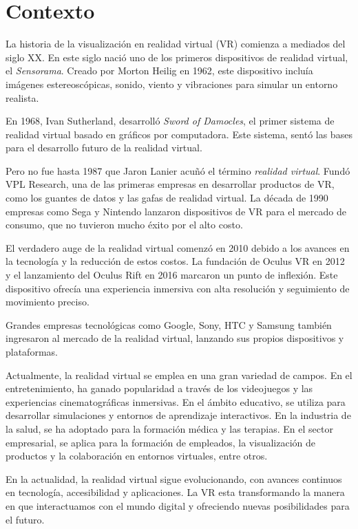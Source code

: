 \documentclass[a4paper, 12pt]{book}
\begin{document}
\section{Contexto}
\label{sec:seccion}


La historia de la visualización en realidad virtual (VR) comienza a mediados del siglo XX. En este siglo nació uno de los primeros dispositivos de realidad virtual, el \textit{Sensorama}. Creado por Morton Heilig en 1962, este dispositivo incluía imágenes estereoscópicas, sonido, viento y vibraciones para simular un entorno realista.

En 1968, Ivan Sutherland, desarrolló \textit{Sword of Damocles}, el primer sistema de realidad virtual basado en gráficos por computadora. Este sistema, sentó las bases para el desarrollo futuro de la realidad virtual.

Pero no fue hasta 1987 que Jaron Lanier acuñó el término \textit{realidad virtual}. Fundó VPL Research, una de las primeras empresas en desarrollar productos de VR, como los guantes de datos y las gafas de realidad virtual. La década de 1990 empresas como Sega y Nintendo lanzaron dispositivos de VR para el mercado de consumo, que no tuvieron mucho éxito por el alto costo.

El verdadero auge de la realidad virtual comenzó en 2010 debido a los avances en la tecnología y la reducción de estos costos. La fundación de Oculus VR en 2012 y el lanzamiento del Oculus Rift en 2016 marcaron un punto de inflexión. Este dispositivo ofrecía una experiencia inmersiva con alta resolución y seguimiento de movimiento preciso.

Grandes empresas tecnológicas como Google, Sony, HTC y Samsung también ingresaron al mercado de la realidad virtual, lanzando sus propios dispositivos y plataformas.

Actualmente, la realidad virtual se emplea en una gran variedad de campos. En el entretenimiento, ha ganado popularidad a través de los videojuegos y las experiencias cinematográficas inmersivas. En el ámbito educativo, se utiliza para desarrollar simulaciones y entornos de aprendizaje interactivos. En la industria de la salud, se ha adoptado para la formación médica y las terapias. En el sector empresarial, se aplica para la formación de empleados, la visualización de productos y la colaboración en entornos virtuales, entre otros.

En la actualidad, la realidad virtual sigue evolucionando, con avances continuos en tecnología, accesibilidad y aplicaciones. La VR esta transformando la manera en que interactuamos con el mundo digital y ofreciendo nuevas posibilidades para el futuro.
\end{document}

